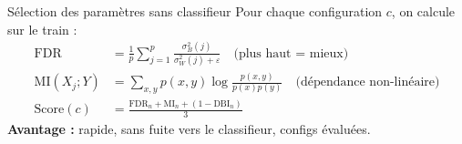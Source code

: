 \begin{frame}{Sélection des paramètres sans classifieur}
  \small
  Pour chaque configuration $c$, on calcule sur le train :
  \begin{align*}
    \text{FDR} &= \frac{1}{p}\sum_{j=1}^{p}\frac{\sigma_B^2(j)}{\sigma_W^2(j)+\varepsilon}
    \quad\text{(plus haut = mieux)} \\[0.3em]
    \text{MI}(X_j;Y) &= \sum_{x,y} p(x,y)\log\frac{p(x,y)}{p(x)p(y)}
    \quad\text{(dépendance non-linéaire)} \\[0.3em]
    \text{Score}(c) &= \frac{\text{FDR}_n + \text{MI}_n + (1-\text{DBI}_n)}{3}
  \end{align*}
  \vspace{0.3em}
  \normalsize
  \textbf{Avantage :} rapide, sans fuite vers le classifieur, \NPhaseOneConfigs{} configs évaluées.
\end{frame}

